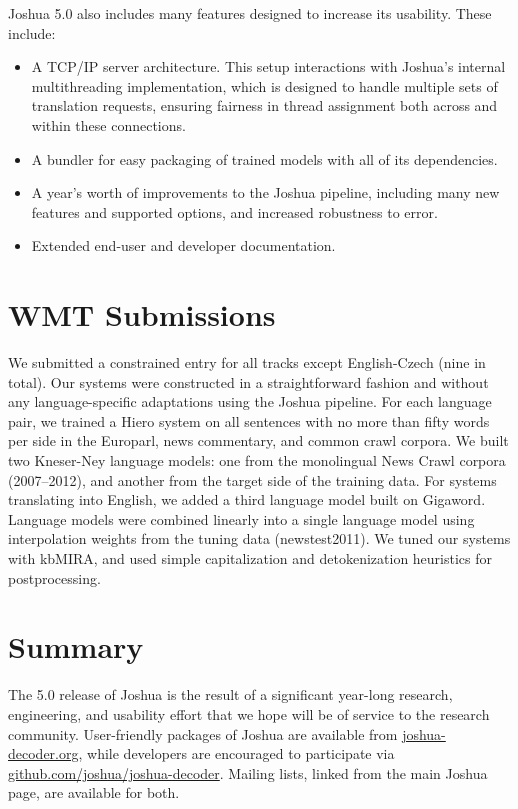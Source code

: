\documentclass[11pt]{article}
\begin{document}
Joshua 5.0 also includes many features designed to increase its
usability.  These include:

\begin{itemize}
\item A TCP/IP server architecture.  This setup interactions with
  Joshua's internal multithreading implementation, which is designed
  to handle multiple sets of translation requests, ensuring fairness
  in thread assignment both across and within these connections.
\item A bundler for easy packaging of trained models with
  all of its dependencies.
\item A year's worth of improvements to the Joshua pipeline, including many
  new features and supported options, and increased robustness to error.
\item Extended end-user and developer documentation.
\end{itemize}


\section{WMT Submissions}

We submitted a constrained entry for all tracks except English-Czech
(nine in total). Our systems were constructed in a straightforward
fashion and without any language-specific adaptations using the Joshua
pipeline. For each language pair, we trained a Hiero system on all
sentences with no more than fifty words per side in the Europarl, news
commentary, and common crawl corpora. We built two Kneser-Ney language
models: one from the monolingual News Crawl corpora (2007--2012), and
another from the target side of the training data.  For systems
translating into English, we added a third language model built on
Gigaword. Language models were combined linearly into a single
language model using interpolation weights from the tuning data
(newstest2011).  We tuned our systems with kbMIRA, and used simple
capitalization and detokenization heuristics for postprocessing.

\section{Summary}

The 5.0 release of Joshua is the result of a significant year-long
research, engineering, and usability effort that we hope will be of
service to the research community. User-friendly packages of Joshua
are available from \url{joshua-decoder.org}, while developers are
encouraged to participate via
\url{github.com/joshua/joshua-decoder}. Mailing lists, linked from the
main Joshua page, are available for both.
\end{document}
